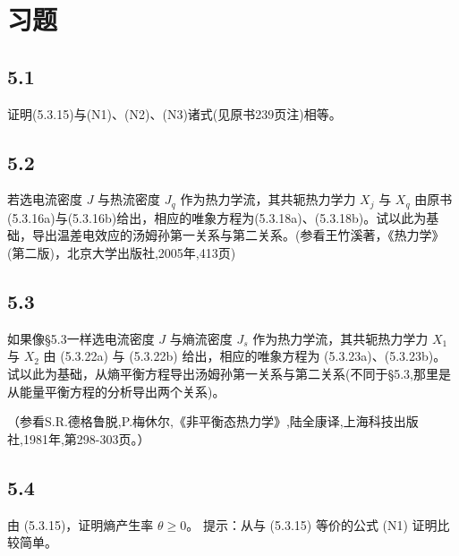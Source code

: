 \section{习题}

\newpage
\subsection{5.1}
证明(5.3.15)与(N1)、(N2)、(N3)诸式(见原书239页注)相等。

\newpage
\subsection{5.2}
若选电流密度 $J$ 与热流密度 $J_q$ 作为热力学流，其共轭热力学力 $X_j$ 与 $X_q$ 由原书(5.3.16a)与(5.3.16b)给出，相应的唯象方程为(5.3.18a)、(5.3.18b)。试以此为基础，导出温差电效应的汤姆孙第一关系与第二关系。(参看王竹溪著，《热力学》(第二版)，北京大学出版社,2005年,413页)

\newpage
\subsection{5.3}
如果像§5.3一样选电流密度 $J$ 与熵流密度 $J_s$ 作为热力学流，其共轭热力学力 $X_1$ 与 $X_2$ 由 (5.3.22a) 与 (5.3.22b) 给出，相应的唯象方程为 (5.3.23a)、(5.3.23b)。试以此为基础，从熵平衡方程导出汤姆孙第一关系与第二关系(不同于§5.3,那里是从能量平衡方程的分析导出两个关系)。

（参看S.R.德格鲁脱,P.梅休尔,《非平衡态热力学》,陆全康译,上海科技出版社,1981年,第298-303页。）

\newpage
\subsection{5.4}
由 (5.3.15)，证明熵产生率 $\theta \geq 0$。
提示：从与 (5.3.15) 等价的公式 (N1) 证明比较简单。